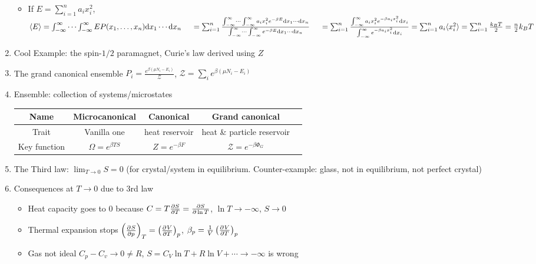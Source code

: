 \documentclass{article}
\theoremstyle{remark}
\newcommand{\ppdv}[4][]{\left(\pdv[#1]{#2}{#3}\right)_{#4}}
\begin{document}
\begin{enumerate}
\begin{itemize}
            \item If $E=\sum_{i=1}^na_ix_i^2$, \newline
                $\langle E\rangle=\int_{-\infty}^{\infty}\cdots\int_{-\infty}^{\infty} EP(x_1,\ldots,x_n)\dd x_1\cdots\dd x_n
                    \newline\null\ \quad=\sum_{i=1}^n\frac{\int_{-\infty}^{\infty}\cdots\int_{-\infty}^{\infty}a_ix_i^2e^{-\beta E}\dd x_1\cdots\dd x_n}{\int_{-\infty}^{\infty}\cdots\int_{-\infty}^{\infty}e^{-\beta E}\dd x_1\cdots\dd x_n}
                    \newline\null\ \quad=\sum_{i=1}^n\frac{\int_{-\infty}^\infty a_ix_i^2e^{-\beta a_ix_i^2}\dd x_i}{\int_{-\infty}^\infty e^{-\beta a_ix_i^2}\dd x_i}
                    =\sum_{i=1}^na_i\langle x_i^2\rangle=\sum_{i=1}^n\frac{k_BT}{2}=\frac{n}{2}k_BT$
        \end{itemize}
    \item Cool Example: the spin-$1/2$ paramagnet, Curie's law derived using $Z$
    \item The grand canonical ensemble $P_i=\frac{e^{\beta(\mu N_i-E_i)}}{\mathcal{Z}}$, $\mathcal{Z}=\sum_ie^{\beta(\mu N_i-E_i)}$
    \item Ensemble: collection of systems/microstates\newline\begin{tabular}{|Sc|c|c|c|}
        \hline Name & Microcanonical & Canonical & Grand canonical\\\hline
        Trait & Vanilla one & heat reservoir & heat \& particle reservoir\\\hline
        Key function & $\Omega=e^{\beta TS}$ & $Z=e^{-\beta F}$ & $\mathcal{Z}=e^{-\beta\Phi_G}$\\\hline
    \end{tabular}
    \item The Third law: $\boxed{\lim_{T\rightarrow 0}S=0}$ (for crystal/system in equilibrium. Counter-example: glass, not in equilibrium, not perfect crystal)
    \item Consequences at $T\rightarrow 0$ due to 3rd law\begin{itemize}
            \item Heat capacity goes to 0 because $C=T\pdv{S}{T}=\pdv{S}{\ln T}$, $\ln T\rightarrow-\infty$, $S\rightarrow0$
            \item Thermal expansion stops $\ppdv{S}{p}{T}=\ppdv{V}{T}{p}$, $\beta_p=\frac{1}{V}\ppdv{V}{T}{p}$
            \item Gas not ideal $C_p-C_v\rightarrow0\neq R$, $S=C_V\ln T+R\ln V+\cdots\rightarrow-\infty$ is wrong

\end{itemize}
\end{enumerate}
\end{document}
